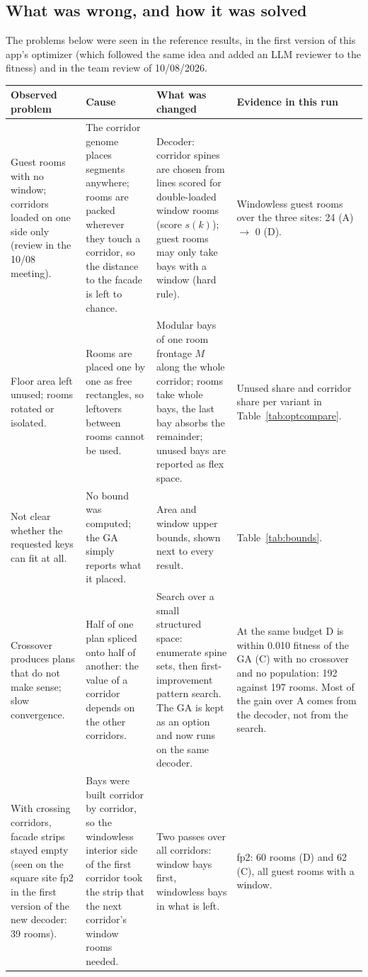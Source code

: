 \documentclass[10pt]{article}
\begin{document}
\subsection{What was wrong, and how it was solved}
The problems below were seen in the reference results, in the first version of this app's optimizer (which followed the
same idea and added an LLM reviewer to the fitness) and in the team review of 10/08/2026.
{\small\begin{longtable}{p{3.3cm}p{3.7cm}p{4.9cm}p{3.6cm}}
\toprule
\textbf{Observed problem} & \textbf{Cause} & \textbf{What was changed} & \textbf{Evidence in this run} \\ \midrule \endhead
Guest rooms with no window; corridors loaded on one side only (review in the 10/08 meeting). & The corridor genome places segments anywhere; rooms are packed wherever they touch a corridor, so the distance to the facade is left to chance. & Decoder: corridor spines are chosen from lines scored for double-loaded window rooms (score $s(k)$); guest rooms may only take bays with a window (hard rule). & Windowless guest rooms over the three sites: 24 (A) $\to$ 0 (D). \\
Floor area left unused; rooms rotated or isolated. & Rooms are placed one by one as free rectangles, so leftovers between rooms cannot be used. & Modular bays of one room frontage $M$ along the whole corridor; rooms take whole bays, the last bay absorbs the remainder; unused bays are reported as flex space. & Unused share and corridor share per variant in Table~\ref{tab:optcompare}. \\
Not clear whether the requested keys can fit at all. & No bound was computed; the GA simply reports what it placed. & Area and window upper bounds, shown next to every result. & Table~\ref{tab:bounds}. \\
Crossover produces plans that do not make sense; slow convergence. & Half of one plan spliced onto half of another: the value of a corridor depends on the other corridors. & Search over a small structured space: enumerate spine sets, then first-improvement pattern search. The GA is kept as an option and now runs on the same decoder. & At the same budget D is within 0.010 fitness of the GA (C) with no crossover and no population: 192 against 197 rooms. Most of the gain over A comes from the decoder, not from the search. \\
With crossing corridors, facade strips stayed empty (seen on the square site fp2 in the first version of the new decoder: 39 rooms). & Bays were built corridor by corridor, so the windowless interior side of the first corridor took the strip that the next corridor's window rooms needed. & Two passes over all corridors: window bays first, windowless bays in what is left. & fp2: 60 rooms (D) and 62 (C), all guest rooms with a window. \\

\end{longtable}}
\end{document}
